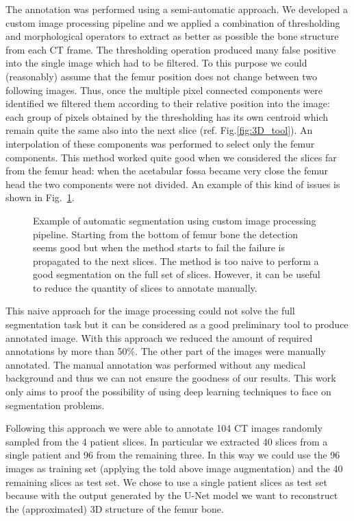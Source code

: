 \documentclass{standalone}
\begin{document}
The annotation was performed using a semi-automatic approach.
We developed a custom image processing pipeline and we applied a combination of thresholding and morphological operators to extract as better as possible the bone structure from each CT frame.
The thresholding operation produced many false positive into the single image which had to be filtered.
To this purpose we could (reasonably) assume that the femur position does not change between two following images.
Thus, once the multiple pixel connected components were identified we filtered them according to their relative position into the image: each group of pixels obtained by the thresholding has its own centroid which remain quite the same also into the next slice (ref. Fig.\ref{fig:3D_tool}).
An interpolation of these components was performed to select only the femur components.
This method worked quite good when we considered the slices far from the femur head: when the acetabular fossa became very close the femur head the two components were not divided.
An example of this kind of issues is shown in Fig.~\ref{fig:seg_tool}.

\begin{figure}[htbp]
\centering
\def\svgwidth{0.85\textwidth}

\caption{Example of automatic segmentation using custom image processing pipeline.
Starting from the bottom of femur bone the detection seems good but when the method starts to fail the failure is propagated to the next slices.
The method is too naive to perform a good segmentation on the full set of slices.
However, it can be useful to reduce the quantity of slices to annotate manually.
}
\label{fig:seg_tool}
\end{figure}

This naive approach for the image processing could not solve the full segmentation task but it can be considered as a good preliminary tool to produce annotated image.
With this approach we reduced the amount of required annotations by more than 50\%.
The other part of the images were manually annotated.
The manual annotation was performed without any medical background and thus we can not ensure the goodness of our results.
This work only aims to proof the possibility of using deep learning techniques to face on segmentation problems.

Following this approach we were able to annotate 104 CT images randomly sampled from the 4 patient slices.
In particular we extracted 40 slices from a single patient and 96 from the remaining three.
In this way we could use the 96 images as training set (applying the told above image augmentation) and the 40 remaining slices as test set.
We chose to use a single patient slices as test set because with the output generated by the U-Net model we want to reconstruct the (approximated) 3D structure of the femur bone.
\end{document}
